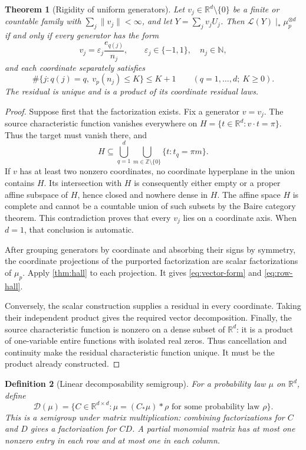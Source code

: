 \documentclass[11pt,a4paper]{article}
\newtheorem{theorem}{Theorem}[section]
\newtheorem{definition}[theorem]{Definition}
\theoremstyle{remark}
\newcommand{\R}{\mathbb R}
\newcommand{\N}{\mathbb N}
\newcommand{\Z}{\mathbb Z}
\newcommand{\Law}{\mathcal L}
\begin{document}
\begin{theorem}[Rigidity of uniform generators]
\label{thm:vector}
Let $v_j\in\R^d\setminus\{0\}$ be a finite or countable family with
$\sum_j\|v_j\|<\infty$, and let $Y=\sum_jv_jU_j$. Then
$\Law(Y)\mid_*\mu_p^{\otimes d}$ if and only if every generator has the form
\begin{equation}
 v_j=\varepsilon_j\frac{e_{q(j)}}{n_j},\qquad
 \varepsilon_j\in\{-1,1\},\quad n_j\in\N,
 \label{eq:vector-form}
\end{equation}
and each coordinate separately satisfies
\begin{equation}
 \#\{j:q(j)=q,\ v_p(n_j)\le K\}\le K+1
 \qquad(q=1,\ldots,d;\ K\ge0).
 \label{eq:row-hall}
\end{equation}
The residual is unique and is a product of its coordinate residual laws.
\end{theorem}
\begin{proof}
Suppose first that the factorization exists. Fix a generator $v=v_j$. The
source characteristic function vanishes everywhere on
$H=\{t\in\R^d:v\cdot t=\pi\}$. Thus the target must vanish there, and
\[
 H\subseteq\bigcup_{q=1}^{d}\bigcup_{m\in\Z\setminus\{0\}}
                  \{t:t_q=\pi m\}.
\]
If $v$ has at least two nonzero coordinates, no coordinate hyperplane in the
union contains $H$. Its intersection with $H$ is consequently either empty
or a proper affine subspace of $H$, hence closed and nowhere dense in $H$.
The affine space $H$ is complete and cannot be a countable union of such
subsets by the Baire category theorem. This contradiction proves that every
$v_j$ lies on a coordinate axis. When $d=1$, that conclusion is automatic.

After grouping generators by coordinate and absorbing their signs by symmetry,
the coordinate projections of the purported factorization are scalar
factorizations of $\mu_p$. Apply \cref{thm:hall} to each projection. It gives
\eqref{eq:vector-form} and \eqref{eq:row-hall}.

Conversely, the scalar construction supplies a residual in every coordinate.
Taking their independent product gives the required vector decomposition.
Finally, the source characteristic function is nonzero on a dense subset of
$\R^d$: it is a product of one-variable entire functions with isolated real
zeros. Thus cancellation and continuity make the residual characteristic
function unique. It must be the product already constructed.
\end{proof}

\begin{definition}[Linear decomposability semigroup]
For a probability law $\mu$ on $\R^d$, define
\[
 \mathcal D(\mu)=\{C\in\R^{d\times d}:\mu=(C_*\mu)*\rho
                    \text{ for some probability law }\rho\}.
\]
This is a semigroup under matrix multiplication: combining factorizations for
$C$ and $D$ gives a factorization for $CD$. A partial monomial matrix has at most
one nonzero entry in each row and at most one in each column.
\end{definition}
\end{document}
